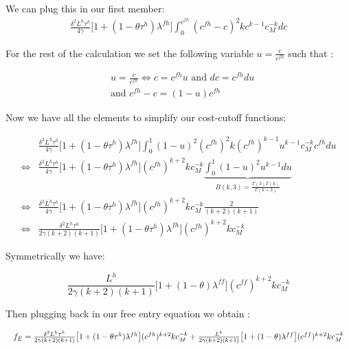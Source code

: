 We can plug this in our first member:
\begin{align*}
    \frac{\delta^2 L^h \tau^h}{4\gamma} \big[ 1 + (1 - \theta \tau^h)\lambda^{fh}\big] \int_{0}^{c^{fh}} (c^{fh} - c)^2  k c^{k-1}c_M^{-k} dc
\end{align*}

For the rest of the calculation we set the following variable $u = \frac{c}{c^{fh}}$ such that : 

\begin{align*}
    &u = \frac{c}{c^{fh}} \Longleftrightarrow c = c^{fh} u \text{ and } dc = c^{fh}du \\
    &\text{and } c^{fh} - c = (1 - u)c^{fh}
\end{align*}

Now we have all the elements to simplify our cost-cutoff functions:

\begin{align*}
    &\frac{\delta^2 L^h \tau^h}{4\gamma} \big[ 1 + (1 - \theta \tau^h)\lambda^{fh}\big] \int_{0}^{1} (1 - u)^2 (c^{fh})^2  k (c^{fh})^{k-1} u^{k-1} c_M^{-k} c^{fh}du \\
    \Longleftrightarrow &\frac{\delta^2 L^h \tau^h}{4\gamma} \big[ 1 + (1 - \theta \tau^h)\lambda^{fh}\big](c^{fh})^{k+2}k c_M^{-k} \underbrace{\int_{0}^{1} (1 - u)^2 u^{k-1} du}_{B(k,3) = \frac{\Gamma(3)\Gamma(k)}{\Gamma(k+3)}} \\
    \Longleftrightarrow &\frac{\delta^2 L^h \tau^h}{4\gamma} \big[ 1 + (1 - \theta \tau^h)\lambda^{fh}\big](c^{fh})^{k+2}k c_M^{-k}\frac{2}{(k+2)(k+1)} \\
    \Longleftrightarrow &\frac{\delta^2 L^h \tau^h}{2\gamma (k+2)(k+1)} \big[ 1 + (1 - \theta \tau^h)\lambda^{fh}\big](c^{fh})^{k+2}k c_M^{-k} 
\end{align*}

Symmetrically we have:

\begin{equation*}
    \frac{L^h}{2\gamma (k+2)(k+1)} \big[ 1 + (1 - \theta)\lambda^{ff}\big](c^{ff})^{k+2}k c_M^{-k}
\end{equation*}

Then plugging back in our free entry equation we obtain : 

\begin{equation*}
\resizebox{\textwidth}{!}{$
    f_E = \frac{\delta^2 L^h \tau^h}{2\gamma (k+2)(k+1)} \big[ 1 + (1 - \theta \tau^h)\lambda^{fh}\big](c^{fh})^{k+2}k c_M^{-k} + \frac{L^h}{2\gamma (k+2)(k+1)} \big[ 1 + (1 - \theta)\lambda^{ff}\big](c^{ff})^{k+2}k c_M^{-k}
    $}
\end{equation*}

